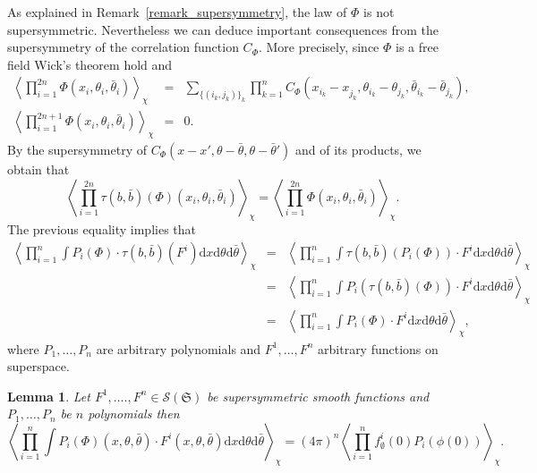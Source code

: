 \documentclass[a4paper,10pt]{article}
\newcommand{\mathd}{\mathrm{d}}
\newtheorem{lemma}{Lemma}
\begin{document}
As explained in Remark~\ref{remark_supersymmetry}, the law of $\Phi$ is not
supersymmetric. Nevertheless we can deduce important consequences from the
supersymmetry of the correlation function $C_{\Phi}$. More precisely, since
$\Phi$ is a free field Wick's theorem hold and
\begin{eqnarray}
  \left\langle \prod_{i = 1}^{2 n} \Phi (x_i, \theta_i, \bar{\theta}_i)
  \right\rangle_{\chi} & = & \sum_{\{ (i_k, j_k) \} _k} \prod_{k = 1}^n
  C_{\Phi} (x_{i_k} - x_{j_k}^{}, \theta_{i_k} - \theta_{j_k},
  \bar{\theta}_{i_k} - \bar{\theta}_{j_k}),  \label{equationsupersymmetry3}\\
  \left\langle \prod_{i = 1}^{2 n + 1} \Phi (x_i, \theta_i, \bar{\theta}_i)
  \right\rangle_{\chi} & = & 0. 
\end{eqnarray}
By the supersymmetry of $C_{\Phi} (x - x', \theta - \bar{\theta}, \theta -
\bar{\theta}')$ and of its products, we obtain that
\[ \left\langle \prod_{i = 1}^{2 n} \tau (b, \bar{b}) (\Phi) (x_i, \theta_i,
   \bar{\theta}_i) \right\rangle_{\chi} = \left\langle \prod_{i = 1}^{2 n}
   \Phi (x_i, \theta_i, \bar{\theta}_i) \right\rangle_{\chi} . \]
The previous equality implies that
\begin{eqnarray}
  \left\langle \prod_{i = 1}^n \int P_i (\Phi) \cdot \tau (b, \bar{b}) (F^i)
  \mathd x \mathd \theta \mathd \bar{\theta} \right\rangle_{\chi} & = &
  \left\langle \prod_{i = 1}^n \int \tau (b, \bar{b}) (P_i (\Phi)) \cdot F^i
  \mathd x \mathd \theta \mathd \bar{\theta} \right\rangle_{\chi} \nonumber\\
  & = & \left\langle \prod_{i = 1}^n \int P_i (\tau (b, \bar{b}) (\Phi))
  \cdot F^i \mathd x \mathd \theta \mathd \bar{\theta} \right\rangle_{\chi}
  \nonumber\\
  & = & \left\langle \prod_{i = 1}^n \int P_i (\Phi) \cdot F^i \mathd x
  \mathd \theta \mathd \bar{\theta} \right\rangle_{\chi}, 
  \label{equationsupersymmetry5}
\end{eqnarray}
where $P_1, \ldots, P_n$ are arbitrary polynomials and $F^1, \ldots, F^n$
arbitrary functions on superspace.

\begin{lemma}
  \label{lemma_supersymmetry1}Let $F^1, \ldots ., F^n \in \mathcal{S}
  (\mathfrak{S})$ be supersymmetric smooth functions and $P_1, \ldots, P_n$ be
  $n$ polynomials then
  \[ \left\langle \prod^n_{i = 1} \int P_i (\Phi) (x, \theta, \bar{\theta})
     \cdot F^i (x, \theta, \bar{\theta}) \mathd x \mathd \theta \mathd
     \bar{\theta} \right\rangle_{\chi} = (4 \pi)^n \left\langle \prod_{i =
     1}^n f^i_{\emptyset} (0) P_i (\phi (0)) \right\rangle_{\chi} . \]
\end{lemma}
\end{document}
